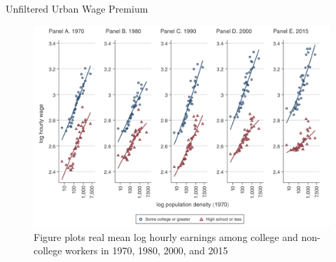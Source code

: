 \documentclass{beamer}
\begin{document}
\begin{frame}{Unfiltered Urban Wage Premium}

\begin{figure}
	\begin{center}
		\includegraphics[scale=0.3]{Figures/Fig7_WagePremium}
		\caption{Figure plots real mean log hourly earnings among college and non-college workers in 1970, 1980, 2000, and 2015}
	\end{center}
\end{figure}

\end{frame}
\end{document}
